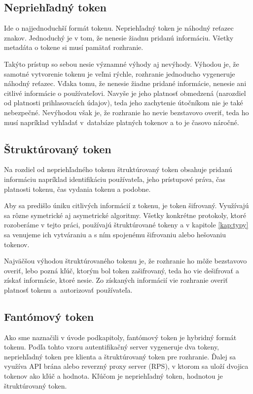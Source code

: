 \subsection{Nepriehľadný token}
\label{sec:opaque}

Ide o najjednoduchší formát tokenu. Nepriehľadný token je náhodný reťazec znakov. Jednoduchý je v tom, že nenesie žiadnu pridanú informáciu. Všetky metadáta o tokene si musí pamätať rozhranie.

Takýto prístup so sebou nesie významné výhody aj nevýhody. Výhodou je, že samotné vytvorenie tokenu je veľmi rýchle, rozhranie jednoducho vygeneruje náhodný reťazec. Vďaka tomu, že nenesie žiadne pridané informácie, nenesie ani citlivé informácie o používateľovi. Navyše je jeho platnosť obmedzená (narozdiel od platnosti prihlasovacích údajov), teda jeho zachytenie útočníkom nie je také nebezpečné. Nevýhodou však je, že rozhranie ho nevie bezstavovo overiť, teda ho musí napríklad vyhľadať v~databáze platných tokenov a to je časovo náročné.


\subsection{Štruktúrovaný token}


Na rozdiel od nepriehľadného tokenu štruktúrovaný token obsahuje pridanú informáciu napríklad identifikáciu používateľa, jeho prístupové práva, čas platnosti tokenu, čas vydania tokenu a podobne.

Aby sa predišlo úniku citlivých informácií z tokenu, je token šifrovaný. Využívajú sa rôzne symetrické aj asymetrické algoritmy. Všetky konkrétne protokoly, ktoré rozoberáme v tejto práci, používajú štruktúrované tokeny a v kapitole \ref{kap:typy} sa venujeme ich vytváraniu a s ním spojenému šifrovaniu alebo hešovaniu tokenov.

Najväčšou výhodou štruktúrovaného tokenu je, že rozhranie ho môže bezstavovo overiť, lebo pozná kľúč, ktorým bol token zašifrovaný, teda ho vie dešifrovať a získať informácie, ktoré nesie. Zo získaných informácií vie rozhranie overiť platnosť tokenu a~autorizovať používateľa.


\subsection{Fantómový token}

Ako sme naznačili v úvode podkapitoly, fantómový token \cite{phantom_token} je hybridný formát tokenu. Podľa tohto vzoru autentifikačný server vygeneruje dva tokeny, nepriehľadný token pre klienta a štruktúrovaný token pre rozhranie. Ďalej sa využíva API brána alebo reverzný proxy server (RPS), v ktorom sa uloží dvojica tokenov ako kľúč a hodnota. Kľúčom je nepriehľadný token, hodnotou je štruktúrovaný token.

